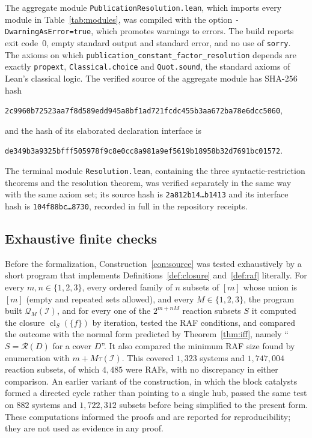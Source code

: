 \documentclass[11pt,a4paper]{article}
\theoremstyle{plain}
\theoremstyle{definition}
\theoremstyle{remark}
\newcommand{\cl}{\operatorname{cl}}
\newcommand{\cQ}{\mathcal{Q}}
\newcommand{\cR}{\mathcal{R}}
\newcommand{\cI}{\mathcal{I}}
\newcommand{\lean}[1]{\texttt{#1}}
\newcommand{\tauI}{\tau(\cI)}
\begin{document}
The aggregate module \lean{PublicationResolution.lean}, which imports every module in Table~\ref{tab:modules}, was compiled with the option \lean{-DwarningAsError=true}, which promotes warnings to errors. The build reports exit code~0, empty standard output and standard error, and no use of \lean{sorry}. The axioms on which \lean{publication\_constant\_factor\_resolution} depends are exactly \lean{propext}, \lean{Classical.choice} and \lean{Quot.sound}, the standard axioms of Lean's classical logic. The verified source of the aggregate module has SHA-256 hash
\begin{center}\small\texttt{2c9960b72523aa7f8d589edd945a8bf1ad721fcdc455b3aa672ba78e6dcc5060},\end{center}
and the hash of its elaborated declaration interface is
\begin{center}\small\texttt{de349b3a9325bfff505978f9c8e0cc8a981a9ef5619b18958b32d7691bc01572}.\end{center}
The terminal module \lean{Resolution.lean}, containing the three syntactic-restriction theorems and the resolution theorem, was verified separately in the same way with the same axiom set; its source hash is \texttt{2a812b14\ldots{}b1413} and its interface hash is \texttt{104f88bc\ldots{}8730}, recorded in full in the repository receipts.

\subsection{Exhaustive finite checks}

Before the formalization, Construction~\ref{con:source} was tested exhaustively by a short program that implements Definitions~\ref{def:closure} and~\ref{def:raf} literally. For every $m,n\in\{1,2,3\}$, every ordered family of $n$ subsets of $[m]$ whose union is $[m]$ (empty and repeated sets allowed), and every $M\in\{1,2,3\}$, the program built $\cQ_M(\cI)$, and for every one of the $2^{m+nM}$ reaction subsets $S$ it computed the closure $\cl_S(\{f\})$ by iteration, tested the RAF conditions, and compared the outcome with the normal form predicted by Theorem~\ref{thm:iff}, namely ``$S=\cR(D)$ for a cover $D$''. It also compared the minimum RAF size found by enumeration with $m+M\tauI$. This covered $1{,}323$ systems and $1{,}747{,}004$ reaction subsets, of which $4{,}485$ were RAFs, with no discrepancy in either comparison. An earlier variant of the construction, in which the block catalysts formed a directed cycle rather than pointing to a single hub, passed the same test on $882$ systems and $1{,}722{,}312$ subsets before being simplified to the present form. These computations informed the proofs and are reported for reproducibility; they are not used as evidence in any proof.
\end{document}
